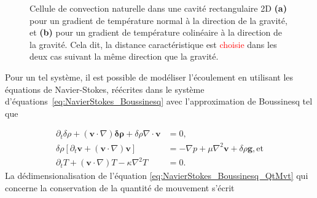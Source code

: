 \begin{figure}[!ht]
    \centering
    
    \caption{Cellule de convection naturelle dans une cavité rectangulaire 2D \textbf{(a)} pour un gradient de température normal à la direction de la gravité, et \textbf{(b)} pour un gradient de température colinéaire à la direction de la gravité. Cela dit, la distance caractéristique est \textcolor{red}{choisie} dans les deux cas suivant la même direction que la gravité.}
    \label{fig:SimuConvNat2D}
\end{figure}



Pour un tel système, il est possible de modéliser l'écoulement en utilisant les équations de Navier-Stokes, réécrites dans le système d'équations~\eqref{eq:NavierStokes_Boussinesq} avec l'approximation de Boussinesq tel que

\begin{subequations}
	\begin{align}
		\partial_t \delta\rho + (\mathbf v \cdot \nabla)\mathbf{\delta\rho} + \delta\rho \nabla \cdot \mathbf{v} &= 0, \label{eq:NavierStokes_Boussinesq_Conti}\\
		\delta\rho [\partial_t \mathbf v + (\mathbf v \cdot \nabla)\mathbf v] &= -\nabla p + \mu \nabla^2 \mathbf v + \delta\rho \mathbf g, \text{et}\label{eq:NavierStokes_Boussinesq_QtMvt}\\
		\partial_t T + (\mathbf v \cdot \nabla) T - \kappa\nabla^2T &= 0. \label{eq:NavierStokes_Boussinesq_NRJinterne}
	\end{align}
	\label{eq:NavierStokes_Boussinesq}%
\end{subequations}
La dédimensionalisation de l'équation \eqref{eq:NavierStokes_Boussinesq_QtMvt} qui concerne la conservation de la quantité de mouvement s'écrit

